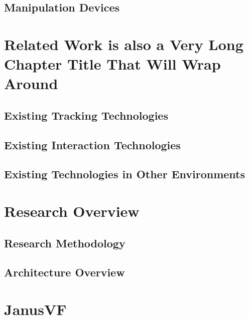 \documentclass[12pt]{report}	%
\begin{document}
\section{Manipulation Devices}

\chapter{Related Work is also a Very Long Chapter Title That Will Wrap Around}
\section{Existing Tracking Technologies}
\section{Existing Interaction Technologies}
\section{Existing Technologies in Other Environments}

\chapter{Research Overview}
\section{Research Methodology}
\section{Architecture Overview}

\chapter{JanusVF}
\end{document}
